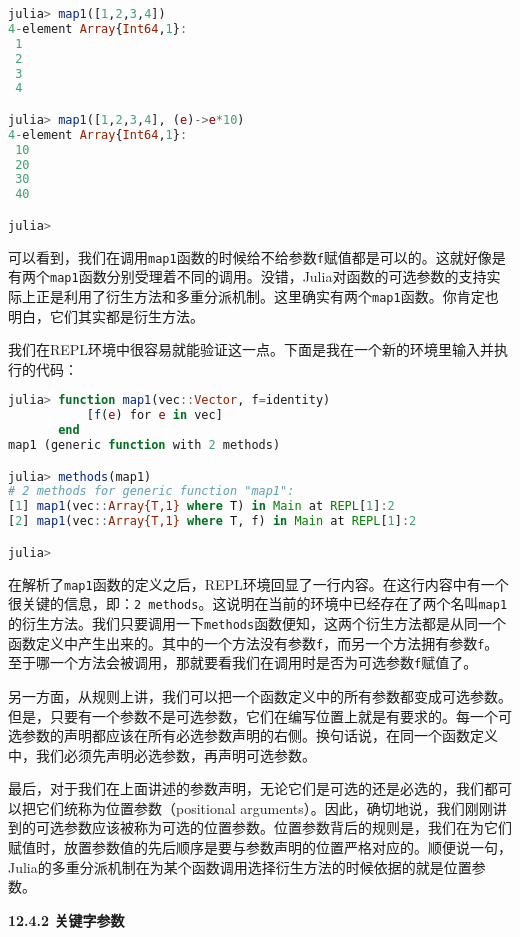 \begin{lstlisting}[language=julia]
julia> map1([1,2,3,4])
4-element Array{Int64,1}:
 1
 2
 3
 4

julia> map1([1,2,3,4], (e)->e*10)
4-element Array{Int64,1}:
 10
 20
 30
 40

julia> 
\end{lstlisting}

可以看到，我们在调用\verb`map1`函数的时候给不给参数\verb`f`赋值都是可以的。这就好像是有两个\verb`map1`函数分别受理着不同的调用。没错，Julia对函数的可选参数的支持实际上正是利用了衍生方法和多重分派机制。这里确实有两个\verb`map1`函数。你肯定也明白，它们其实都是衍生方法。

我们在REPL环境中很容易就能验证这一点。下面是我在一个新的环境里输入并执行的代码：

\begin{lstlisting}[language=julia]
julia> function map1(vec::Vector, f=identity)
           [f(e) for e in vec]
       end
map1 (generic function with 2 methods)

julia> methods(map1)
# 2 methods for generic function "map1":
[1] map1(vec::Array{T,1} where T) in Main at REPL[1]:2
[2] map1(vec::Array{T,1} where T, f) in Main at REPL[1]:2

julia> 
\end{lstlisting}

在解析了\verb`map1`函数的定义之后，REPL环境回显了一行内容。在这行内容中有一个很关键的信息，即：\verb`2 methods`。这说明在当前的环境中已经存在了两个名叫\verb`map1`的衍生方法。我们只要调用一下\verb`methods`函数便知，这两个衍生方法都是从同一个函数定义中产生出来的。其中的一个方法没有参数\verb`f`，而另一个方法拥有参数\verb`f`。至于哪一个方法会被调用，那就要看我们在调用时是否为可选参数\verb`f`赋值了。

另一方面，从规则上讲，我们可以把一个函数定义中的所有参数都变成可选参数。但是，只要有一个参数不是可选参数，它们在编写位置上就是有要求的。每一个可选参数的声明都应该在所有必选参数声明的右侧。换句话说，在同一个函数定义中，我们必须先声明必选参数，再声明可选参数。

最后，对于我们在上面讲述的参数声明，无论它们是可选的还是必选的，我们都可以把它们统称为位置参数（positional arguments）。因此，确切地说，我们刚刚讲到的可选参数应该被称为可选的位置参数。位置参数背后的规则是，我们在为它们赋值时，放置参数值的先后顺序是要与参数声明的位置严格对应的。顺便说一句，Julia的多重分派机制在为某个函数调用选择衍生方法的时候依据的就是位置参数。

\textbf{12.4.2 关键字参数}


